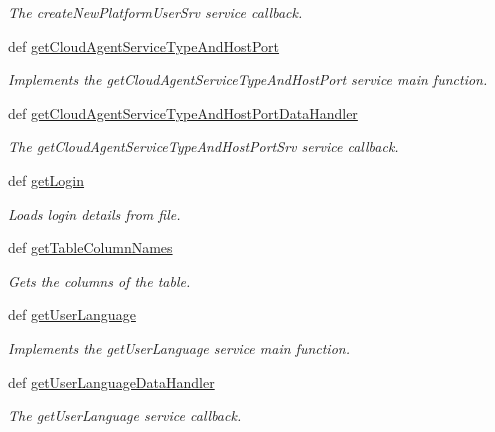 \begin{DoxyCompactItemize}
\begin{DoxyCompactList}\small\item\em The create\-New\-Platform\-User\-Srv service callback. \end{DoxyCompactList}\item 
def \hyperlink{classmysql__wrapper_1_1MySQLdbWrapper_a82218f85ddad7b39bdb13ab86365919e}{get\-Cloud\-Agent\-Service\-Type\-And\-Host\-Port}
\begin{DoxyCompactList}\small\item\em Implements the get\-Cloud\-Agent\-Service\-Type\-And\-Host\-Port service main function. \end{DoxyCompactList}\item 
def \hyperlink{classmysql__wrapper_1_1MySQLdbWrapper_a88188bf92c568e8b287899adb6cc8336}{get\-Cloud\-Agent\-Service\-Type\-And\-Host\-Port\-Data\-Handler}
\begin{DoxyCompactList}\small\item\em The get\-Cloud\-Agent\-Service\-Type\-And\-Host\-Port\-Srv service callback. \end{DoxyCompactList}\item 
def \hyperlink{classmysql__wrapper_1_1MySQLdbWrapper_aee044e7881e8cf2606237381e22c506a}{get\-Login}
\begin{DoxyCompactList}\small\item\em Loads login details from file. \end{DoxyCompactList}\item 
def \hyperlink{classmysql__wrapper_1_1MySQLdbWrapper_a563e04fe07ecfc2d15461a4c4bdba65a}{get\-Table\-Column\-Names}
\begin{DoxyCompactList}\small\item\em Gets the columns of the table. \end{DoxyCompactList}\item 
def \hyperlink{classmysql__wrapper_1_1MySQLdbWrapper_a1755a075e48f2010e640f5419a0d4016}{get\-User\-Language}
\begin{DoxyCompactList}\small\item\em Implements the get\-User\-Language service main function. \end{DoxyCompactList}\item 
def \hyperlink{classmysql__wrapper_1_1MySQLdbWrapper_a055aa3d89849e1d97d3772607e49fc50}{get\-User\-Language\-Data\-Handler}
\begin{DoxyCompactList}\small\item\em The get\-User\-Language service callback. \end{DoxyCompactList}\item 

\end{DoxyCompactItemize}
